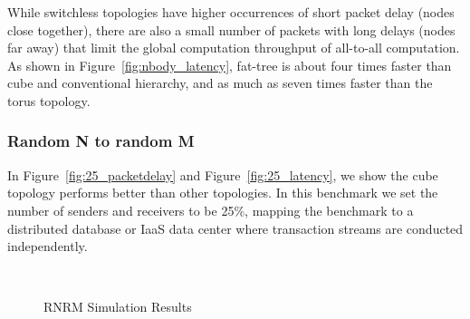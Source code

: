 While switchless topologies have higher occurrences of short packet delay (nodes close together), there are also a small number of packets with long delays (nodes far away) that limit the global computation throughput of all-to-all computation. As shown in Figure~\ref{fig:nbody_latency}, fat-tree is about four times faster than cube and conventional hierarchy, and as much as seven times faster than the torus topology.


\subsubsection{Random N to random M}
In Figure~\ref{fig:25_packetdelay} and Figure~\ref{fig:25_latency}, we show the cube topology performs better than other topologies. In this benchmark we set the number of senders and receivers to be 25\%, mapping the benchmark to a distributed database or IaaS data center where transaction streams are conducted independently.

\captionsetup[subfloat]{captionskip=-0.003in}
\begin{figure}
    \centering
    \\
    \vspace{-0.1in}
    \vspace{-0.07in}
    \caption{RNRM Simulation Results}
    \vspace{-0.1in}
\end{figure}



